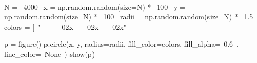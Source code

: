 \begin{paracol}{2}
\smallskip
\begin{cellExecute}[escapechar=~]
~~
\end{cellExecute}
\switchcolumn
\begin{codeCell}[escapechar=~]
N = ~\textcolor{mtk7}{4000}~
x = np.random.random(size=N) * ~\textcolor{mtk7}{100}~
y = np.random.random(size=N) * ~\textcolor{mtk7}{100}~
radii = np.random.random(size=N) * ~\textcolor{mtk7}{1.5}~
colors = [~\textcolor{mtk25}{"}~~~~~~\textcolor{mtk25}{02x}~~~~\textcolor{mtk25}{02x}~~~~\textcolor{mtk25}{02x"}~ %

p = figure()
p.circle(x, y, radius=radii, fill_color=colors, fill_alpha=~\textcolor{mtk7}{0.6}~, line_color=~\textcolor{mtk6}{None}~)
show(p)
\end{codeCell}
\end{paracol}

\begin{paracol}{2}
\begin{cellExecute}[escapechar=~]
~~
\end{cellExecute}
\switchcolumn
\begin{resultCell}[escapechar=~]
\end{resultCell}
\end{paracol}
